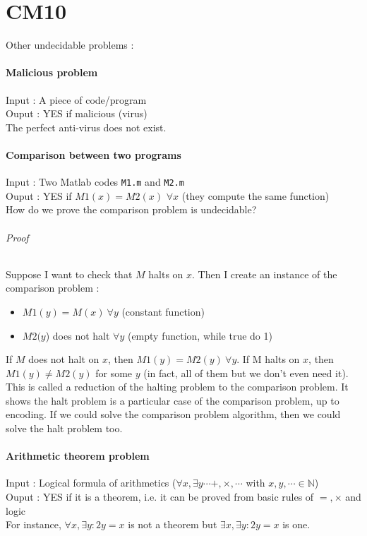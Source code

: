 \part{CM10}

Other undecidable problems :
\subsection{Malicious problem}
Input : A piece of code/program\\
Ouput : YES if malicious (virus)\\
The perfect anti-virus does not exist.

\subsection{Comparison between two programs}
Input : Two Matlab codes \texttt{M1.m} and \texttt{M2.m}\\
Ouput : YES if $M1(x) = M2(x)$ $\forall x$ (they compute the same function)\\
How do we prove the comparison problem is undecidable?
\paragraph{Proof} Suppose I want to check that $M$ halts on $x$. Then I create an instance of the comparison problem : 
\begin{itemize}
\item $M1(y) = M(x) \ \forall y$ (constant function)
\item $M2(y$) does not halt $\forall y$ (empty function, while true do 1)
\end{itemize}
If $M$ does not halt on $x$, then $M1(y) = M2(y) \ \forall y$. If M halts on $x$, then  $M1(y) \neq M2(y)$ for some $y$ (in fact, all of them but we don't even need it).
This is called a reduction of the halting problem to the comparison problem. It shows the halt problem is a particular case of the comparison problem, up to encoding. If we could solve the comparison problem algorithm, then we could solve the halt problem too.

\subsection{Arithmetic theorem problem}
Input : Logical formula of arithmetics ($\forall x, \exists y \cdots +, \times, \cdots$ with $x,y,\cdots \in \mathbb{N}$)\\
Ouput : YES if it is a theorem, i.e. it can be proved from basic rules of $=,\times$ and logic\\
For instance, $\forall x, \exists y : 2y = x$ is not a theorem but  $\exists x, \exists y : 2y = x$ is one.\\

